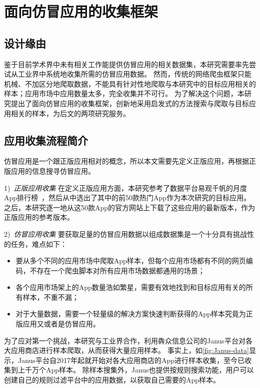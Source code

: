 \chapter{面向仿冒应用的收集框架\mytool}
\label{chp:fakerevealer}

\section{设计缘由}
鉴于目前学术界中未有相关工作能提供仿冒应用的相关数据集，本研究需要率先尝试从工业界中系统地收集所需的仿冒应用数据。
然而，传统的网络爬虫框架只能机械、不加区分地爬取数据，不能具有针对性地爬取与本研究中的目标应用相关的样本；应用市场中应用数量太多，完全收集并不可行。
为了解决这个问题，本研究提出了面向仿冒应用的收集框架\mytool，创新地采用启发式的方法搜索与爬取与目标应用相关的样本，为后文的两项研究服务。

\section{应用收集流程简介}
仿冒应用是一个跟正版应用相对的概念，所以本文需要先定义正版应用，再根据正版应用的信息搜寻仿冒应用。

1)\ \emph{正版应用收集} \quad
在定义正版应用方面，本研究参考了数据平台易观千帆的月度App排行榜~\cite{yiguanqianfan}，然后从中选出了其中的前50款热门App作为本次研究的目标应用。
之后，本研究逐一地从这50款App的官方网站上下载了这些应用的最新版本，作为正版应用的参考版本。

2)\ \emph{仿冒应用收集} \quad
要获取足量的仿冒应用数据以组成数据集是一个十分具有挑战性的任务，难点如下：
\begin{itemize}
	\item 要从多个不同的应用市场中爬取App样本，但每个应用市场都有不同的网页编码，不存在一个爬虫脚本对所有应用市场数据都通用的场景；
	\item 各个应用市场架上的App数量浩如繁星，需要有效地找到和目标应用有关的所有样本，不重不漏；
	\item 对于大量数据，需要一个轻量级的解决方案快速判断获得的App样本究竟为正版应用又或者是仿冒应用。
\end{itemize}

为了应对第一个挑战，本研究与工业界合作，利用犇众信息公司的Janus平台对各大应用商店进行样本爬取，从而获得大量应用样本。
事实上，如\autoref{fig:Janus-data}显示，Janus平台自2017年起就开始对各大应用商店的App进行样本收集，至今已收集到上千万个App样本。
除样本搜集外，Janus也提供按规则搜索功能，用户可以创建自己的规则过滤平台中的应用数据，以获取自己需要的App样本。

